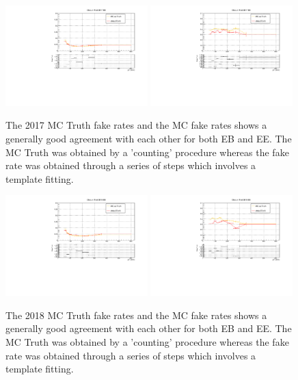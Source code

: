 \begin{figure}[!htbp]
 \caption{The 2017 MC Truth fake rates and the MC fake rates shows a generally good agreement with each other for both EB and EE. The MC Truth was obtained by a 'counting' procedure whereas the fake rate was obtained through a series of steps which involves a template fitting.}
  \centering
  \includegraphics[width=0.49\textwidth]{fig/closureTest_MCTruth_comparisonsEB_2017_adjustrange.pdf}
  \includegraphics[width=0.49\textwidth]{fig/closureTest_MCTruth_comparisonsEE_2017_adjustrange.pdf}
  \label{fig:fakerates_2017}
\end{figure}



\begin{figure}[!htbp]
 \caption{The 2018 MC Truth fake rates and the MC fake rates shows a generally good agreement with each other for both EB and EE. The MC Truth was obtained by a 'counting' procedure whereas the fake rate was obtained through a series of steps which involves a template fitting.}
  \centering
  \includegraphics[width=0.49\textwidth]{fig/closureTest_MCTruth_comparisonsEB_2018_adjustrange.pdf}
  \includegraphics[width=0.49\textwidth]{fig/closureTest_MCTruth_comparisonsEE_2018_adjustrange.pdf}
  \label{fig:fakerates_2018}
\end{figure}


